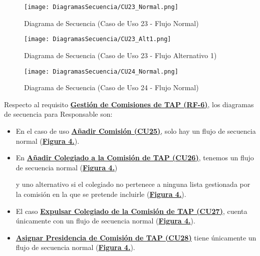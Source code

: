 \begin{landscape}
  \label{fig:Secuencia_CU23_Normal}
  \vspace*{\fill}
  \begin{figure}[!htbp]
    \centering
    \texttt{[image: DiagramasSecuencia/CU23\_Normal.png]}
    \caption{Diagrama de Secuencia (Caso de Uso 23 - Flujo Normal)}
  \end{figure}
  \vfill
\end{landscape}
\FloatBarrier

\begin{landscape}
  \label{fig:Secuencia_CU23_Alt1}
  \vspace*{\fill}
  \begin{figure}[!htbp]
    \centering
    \texttt{[image: DiagramasSecuencia/CU23\_Alt1.png]}
    \caption{Diagrama de Secuencia (Caso de Uso 23 - Flujo Alternativo 1)}
  \end{figure}
  \vfill
\end{landscape}
\FloatBarrier

\begin{landscape}
  \label{fig:Secuencia_CU24_Normal}
  \vspace*{\fill}
  \begin{figure}[!htbp]
    \centering
    \texttt{[image: DiagramasSecuencia/CU24\_Normal.png]}
    \caption{Diagrama de Secuencia (Caso de Uso 24 - Flujo Normal)}
  \end{figure}
  \vfill
\end{landscape}
\FloatBarrier


Respecto al requisito \textbf{\hyperref[tab:rfGestComTAP]{Gestión de Comisiones de TAP (RF-6)}}, los diagramas de secuencia para Responsable son:
\begin{itemize}
  \item \addtocounter{figura_cap4}{1} En el caso de uso \textbf{\hyperref[tab:curCrearComision]{Añadir Comisión (CU25)}}, solo hay un flujo de secuencia normal (\textbf{\hyperref[fig:Secuencia_CU25_Normal]{Figura 4.}}).
  \item \addtocounter{figura_cap4}{1} En \textbf{\hyperref[tab:curIncluirColegComisionTAP]{Añadir Colegiado a la Comisión de TAP (CU26)}}, tenemos un flujo de secuencia normal (\textbf{\hyperref[fig:Secuencia_CU26_Normal]{Figura 4.}}) \addtocounter{figura_cap4}{1} y uno alternativo si el colegiado no pertenece a ninguna lista gestionada por la comisión en la que se pretende incluirle (\textbf{\hyperref[fig:Secuencia_CU26_Alt1]{Figura 4.}}).
  \item \addtocounter{figura_cap4}{1} El caso \textbf{\hyperref[tab:curExpulsarColegComisionTAP]{Expulsar Colegiado de la Comisión de TAP (CU27)}}, cuenta únicamente con un flujo de secuencia normal (\textbf{\hyperref[fig:Secuencia_CU27_Normal]{Figura 4.}}).
  \item \addtocounter{figura_cap4}{1} \textbf{\hyperref[tab:curAsignarPresidenciaComisionTAP]{Asignar Presidencia de Comisión de TAP (CU28)}} tiene únicamente un flujo de secuencia normal (\textbf{\hyperref[fig:Secuencia_CU28_Normal]{Figura 4.}}).
\end{itemize}

